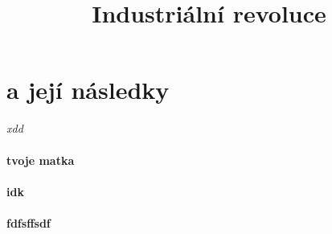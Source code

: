 \documentclass{article}
\title{\vspace{-2cm}Industriální revoluce\vspace{-1.7cm}}
\date{}
\author{}
\begin{document}
\maketitle

\section{a její následky}
\textit{xdd}
\paragraph{tvoje matka}
\paragraph{idk}
\paragraph{fdfsffsdf}
\end{document}
